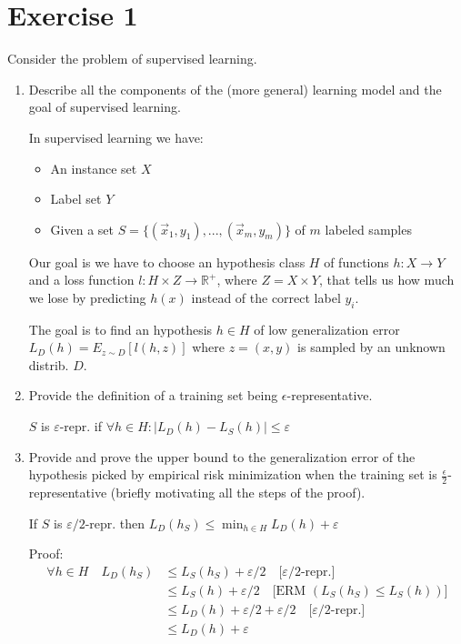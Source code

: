 \documentclass[a4paper,11pt,oneside]{book}
\begin{document}
\section{Exercise 1}
    Consider the problem of supervised learning.
    \begin{enumerate}
        \item Describe all the components of the (more general) learning model and the goal of supervised learning.
        \begin{solution}
            In supervised learning we have:
            \begin{itemize}
            \item An instance set $X$
            \item Label set $Y$
            \item Given a set $S = \{(\vec{x}_1, y_1),...,(\vec{x}_m, y_m)\}$ of $m$ labeled samples
            \end{itemize}
            
            Our goal is we have to choose an hypothesis class $H$ of functions $h: X \to Y$ and a loss function $l: H\times Z \to \mathbb{R}^+$, where $Z = X\times Y$, that tells us how much we lose by predicting $h(x)$ instead of the correct label $y_i$.
            
            The goal is to find an hypothesis $h \in H$ of low generalization error $L_D(h) = E_{z\sim D}[l(h,z)]$ where $z = (x,y)$ is sampled by an unknown distrib. $D$.
        \end{solution}
        \item Provide the definition of a training set being $\epsilon$-representative.
        \begin{solution}
            $S$ is $\varepsilon$-repr. if $\forall h \in H : |L_D(h)-L_S(h)| \leq \varepsilon$
        \end{solution}      
        \item Provide and prove the upper bound to the generalization error of the hypothesis picked by empirical risk minimization when the training set is $\frac{\epsilon}{2}$-representative (briefly motivating all the steps of the proof).
        \begin{solution}
            If $S$ is $\varepsilon/2$-repr. then $L_D(h_S) \leq \min_{h\in H} L_D(h) + \varepsilon$

            Proof:
            \begin{align*}
            \forall h \in H \quad L_D(h_S) &\leq L_S(h_S) + \varepsilon/2 \quad \text{[$\varepsilon/2$-repr.]} \\
            &\leq L_S(h) + \varepsilon/2 \quad \text{[ERM $(L_S(h_S) \leq L_S(h))$]} \\
            &\leq L_D(h) + \varepsilon/2 + \varepsilon/2 \quad \text{[$\varepsilon/2$-repr.]} \\
            &\leq L_D(h) + \varepsilon
            \end{align*}


\end{solution}
\end{enumerate}
\end{document}
